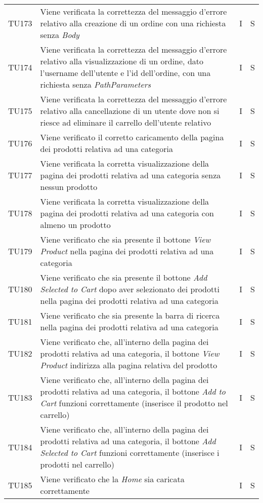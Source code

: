 {\begin{longtable}{C{2cm} C{9.6cm} C{1.5cm} C{1cm}}
TU173 & Viene verificata la correttezza del messaggio d'errore relativo alla creazione di un ordine con una richiesta senza \textit{Body} & I & S\\

TU174 & Viene verificata la correttezza del messaggio d'errore relativo alla visualizzazione di un ordine, dato l'username dell'utente e l'id dell'ordine, con una richiesta senza \textit{PathParameters} & I & S\\

TU175 & Viene verificata la correttezza del messaggio d'errore relativo alla cancellazione di un utente dove non si riesce ad eliminare il carrello dell'utente relativo & I & S\\

TU176 & Viene verificato il corretto caricamento della pagina dei prodotti relativa ad una categoria & I & S\\

TU177 & Viene verificata la corretta visualizzazione della pagina dei prodotti relativa ad una categoria senza nessun prodotto & I & S\\

TU178 & Viene verificata la corretta visualizzazione della pagina dei prodotti relativa ad una categoria con almeno un prodotto & I & S\\

TU179 & Viene verificato che sia presente il bottone \textit{View Product} nella pagina dei prodotti relativa ad una categoria & I & S\\

TU180 & Viene verificato che sia presente il bottone \textit{Add Selected to Cart} dopo aver selezionato dei prodotti nella pagina dei prodotti relativa ad una categoria & I & S\\

TU181 & Viene verificato che sia presente la barra di ricerca nella pagina dei prodotti relativa ad una categoria & I & S\\

TU182 & Viene verificato che, all'interno della pagina dei prodotti relativa ad una categoria, il bottone \textit{View Product} indirizza alla pagina relativa del prodotto & I & S\\

TU183 & Viene verificato che, all'interno della pagina dei prodotti relativa ad una categoria, il bottone \textit{Add to Cart} funzioni correttamente (inserisce il prodotto nel carrello) & I & S\\

TU184 & Viene verificato che, all'interno della pagina dei prodotti relativa ad una categoria, il bottone \textit{Add Selected to Cart} funzioni correttamente (inserisce i prodotti nel carrello) & I & S\\

TU185 & Viene verificato che la \textit{Home} sia caricata correttamente & I & S\\


\end{longtable}

}


